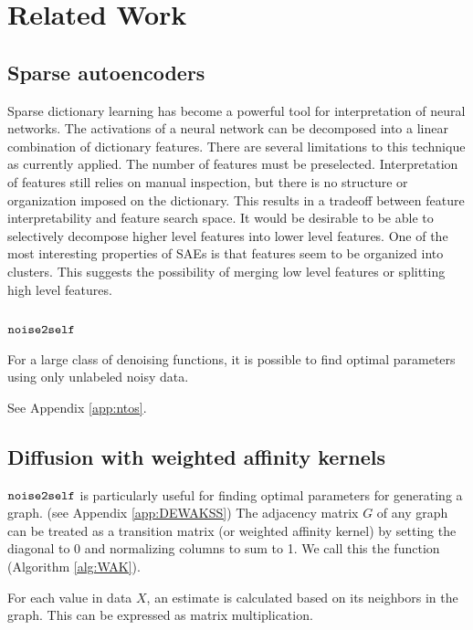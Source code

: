 \section{Related Work}

\subsection{Sparse autoencoders}
Sparse dictionary learning has become a powerful tool for interpretation of neural networks. 
The activations of a neural network can be decomposed into a linear combination of dictionary features\cite{cunningham2023sparse}.
There are several limitations to this technique as currently applied.
The number of features must be preselected.
Interpretation of features still relies on manual inspection,
but there is no structure or organization imposed on the dictionary.
This results in a tradeoff between feature interpretability and feature search space. 
It would be desirable to be able to selectively decompose higher level features into lower level features.
One of the most interesting properties of SAEs is that features seem to be organized into clusters\cite{bricken2023monosemanticity}.
This suggests the possibility of merging low level features or splitting high level features.



\subsection{$\mathop{\mathtt{noise2self}}\limits$}
For a large class of denoising functions, it is possible to find optimal parameters using only unlabeled noisy data\cite{batson2019noise2self}.

See Appendix \ref{app:ntos}.

\subsection{Diffusion with weighted affinity kernels}

$\mathop{\mathtt{noise2self}}\limits$ is particularly useful for finding optimal parameters for generating a graph\cite{tjarnberg2021}.
(see Appendix \ref{app:DEWAKSS})
The adjacency matrix $G$ of any graph can be treated as a transition matrix (or weighted affinity kernel) by setting the diagonal to 0 and normalizing columns to sum to 1. We call this the \WAK function (Algorithm \ref{alg:WAK}).

For each value in data $X$, an estimate is calculated based on its neighbors in the graph. This can be expressed as matrix multiplication.

